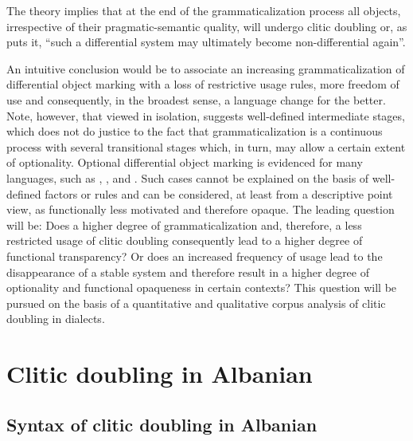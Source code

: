 \documentclass[output=paper]{langsci/langscibook}
\begin{document}
The theory implies that at the end of the grammaticalization process all objects, irrespective of their pragmatic-semantic quality, will undergo clitic doubling or, as \citet[152]{Bossong1991} puts it, \enquote{such a differential system may ultimately become non-differential again}.\largerpage[-1]

An intuitive conclusion would be to associate an increasing grammaticalization of differential object marking with a loss of restrictive usage rules, more freedom of use and consequently, in the broadest sense, a language change for the better. Note, however, that  viewed in isolation, suggests well-defined intermediate stages, which does not do justice to the fact that grammaticalization is a continuous process with several transitional stages which, in turn, may allow a certain extent of optionality. Optional differential object marking is evidenced for many languages, such as , , and  \citep{Aissen2003}. Such cases cannot be explained on the basis of well-defined factors or rules and can be considered, at least from a descriptive point view, as functionally less motivated and therefore opaque. The leading question will be: Does a higher degree of grammaticalization and, therefore, a less restricted usage of clitic doubling consequently lead to a higher degree of functional transparency? Or does an increased frequency of usage lead to the disappearance of a stable system and therefore result in a higher degree of optionality and functional opaqueness in certain contexts? This question will be pursued on the basis of a quantitative and qualitative corpus analysis of clitic doubling in  dialects.

\section{Clitic doubling in Albanian}

\subsection{Syntax of clitic doubling in Albanian}
\end{document}
